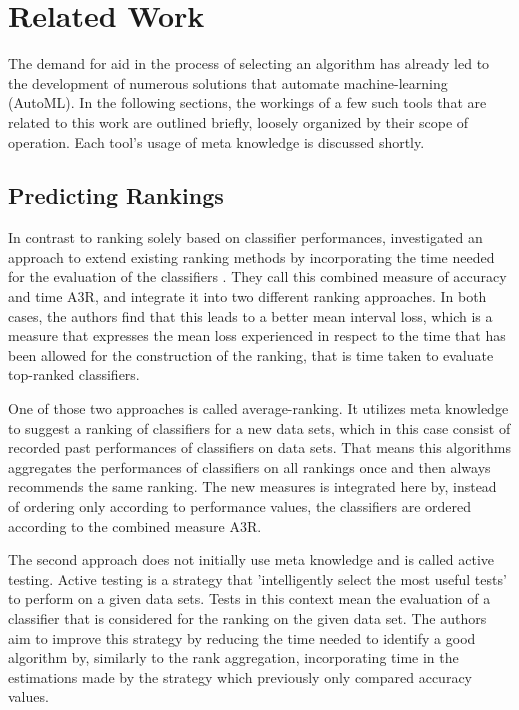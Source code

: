 \chapter{Related Work}
\label{sec:related}
The demand for aid in the process of selecting an algorithm has already led to the development of numerous solutions that automate machine-learning (AutoML). In the following sections, the workings of a few such tools that are related to this work are outlined briefly, loosely organized by their scope of operation. Each tool's usage of meta knowledge is discussed shortly.\\ 

\section{Predicting Rankings}
In contrast to ranking solely based on classifier performances, \citeauthor{DBLP:journals/ml/AbdulrahmanBRV18} investigated an approach to extend existing ranking methods by incorporating the time needed for the evaluation of the classifiers \cite{DBLP:journals/ml/AbdulrahmanBRV18}. They call this combined measure of accuracy and time A3R, and integrate it into two different ranking approaches. In both cases, the authors find that this leads to a better mean interval loss, which is a measure that expresses the mean loss experienced in respect to the time that has been allowed for the construction of the ranking, that is time taken to evaluate top-ranked classifiers. 

One of those two approaches is called average-ranking. It utilizes meta knowledge to suggest a ranking of classifiers for a new data sets, which in this case consist of recorded past performances of classifiers on data sets. That means this algorithms aggregates the performances of classifiers on all rankings once and then always recommends the same ranking. The new measures is integrated here by, instead of ordering only according to performance values, the classifiers are ordered according to the combined measure A3R.

The second approach does not initially use meta knowledge and is called active testing. Active testing is a strategy that 'intelligently select the most useful tests' \cite{DBLP:journals/ml/AbdulrahmanBRV18} to perform on a given data sets. Tests in this context mean the evaluation of a classifier that is considered for the ranking on the given data set. The authors aim to improve this strategy by reducing the time needed to identify a good algorithm by, similarly to the rank aggregation, incorporating time in the estimations made by the strategy which previously only compared accuracy values.

